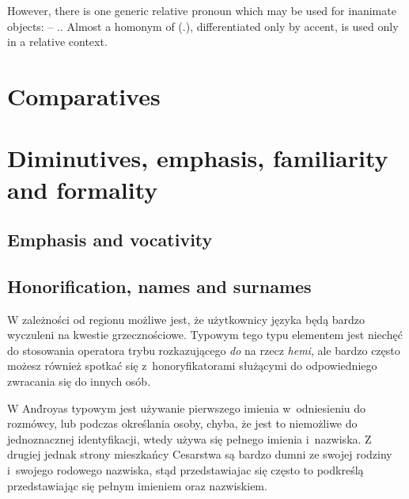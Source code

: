 However, there is one generic relative pronoun which may be used for inanimate
objects:  -- \Rel{}.\Inan{}. Almost a homonym of 
(\Tpl{}.\Inan{}), differentiated only by accent,  is used only in a
relative context.

\section{Comparatives}
\label{sec:comparatives}


\section{Diminutives, emphasis, familiarity and formality}
\label{sec:diminutives}

\subsection{Emphasis and vocativity}


\subsection{Honorification, names and surnames}


W zależności od regionu możliwe jest, że użytkownicy języka będą bardzo
wyczuleni na kwestie grzecznościowe. Typowym tego typu elementem jest niechęć do
stosowania operatora trybu rozkazującego \emph{do} na rzecz \emph{hemi}, ale
bardzo często możesz również spotkać się z~honoryfikatorami służącymi do
odpowiedniego zwracania się do innych osób.

W And́royas typowym jest używanie pierwszego imienia w~odniesieniu do rozmówcy,
lub podczas określania osoby, chyba, że jest to niemożliwe do jednoznacznej
identyfikacji, wtedy używa się pełnego imienia i~nazwiska. Z drugiej jednak
strony mieszkańcy Cesarstwa są bardzo dumni ze swojej rodziny i~swojego rodowego
nazwiska, stąd przedstawiajac się często to podkreślą przedstawiając się pełnym
imieniem oraz nazwiskiem.


